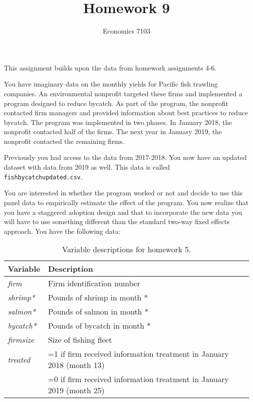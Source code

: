 \documentclass{article}
\title{Homework 9}
\author{Economics 7103}
\begin{document}
  
\maketitle

\noindent This assignment builds upon the data from homework assignments 4-6.
\medskip

You have imaginary data on the monthly yields for Pacific fish trawling companies.  An environmental nonprofit targeted these firms and implemented a program designed to reduce bycatch.  As part of the program, the nonprofit contacted firm managers and provided information about best practices to reduce bycatch.  The program was implemented in two phases.  In January 2018, the nonprofit contacted half of the firms.  The next year in January 2019, the nonprofit contacted the remaining firms.

Previously you had access to the data from 2017-2018.  You now have an updated dataset with data from 2019 as well.  This data is called \verb!fishbycatchupdated.csv!.

You are interested in whether the program worked or not and decide to use this panel data to empirically estimate the effect of the program.  You now realize that you have a staggered adoption design and that to incorporate the new data you will have to use something different than the standard two-way fixed effects approach.  You have the following data:

\begin{table}[h]
    \centering
    \begin{tabular}{l|l}
        Variable & Description \\ \hline
         \textit{firm} & Firm identification number  \\
         \textit{shrimp*} & Pounds of shrimp in month * \\
         \textit{salmon*} & Pounds of salmon in month * \\
         \textit{bycatch*} & Pounds of bycatch in month * \\
         \textit{firmsize} & Size of fishing fleet \\
         \textit{treated} & =1 if firm received information treatment in January 2018 (month 13) \\
            & =0 if firm received information treatment in January 2019 (month 25)
    \end{tabular}
    \caption{Variable descriptions for homework 5.}
    \label{tab:variables4}
\end{table}
\end{document}
